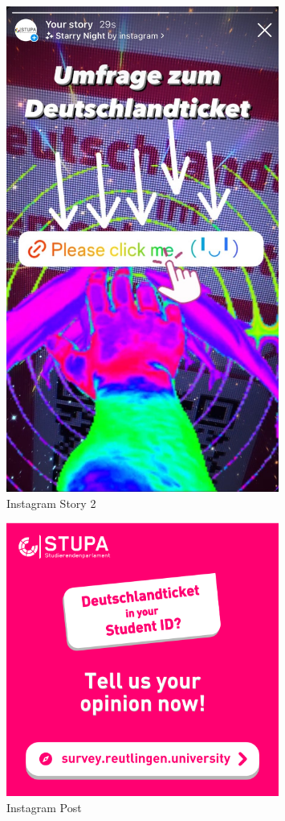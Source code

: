 \begin{multicols}{3}
\begin{figure}[H]
       \includegraphics[width=0.8\textwidth]{Content/Images/Story_2.jpeg}
       \caption{Instagram Story 2}
       \label{fig:InstagramStory2}
    \end{figure}
    \columnbreak
    \begin{figure}[H]
        \vspace{0.3\textwidth}
        \includegraphics[width=0.8\textwidth]{Content/Images/IG_Square.png}
        \caption{Instagram Post}
        \label{fig:InstagramPost}
    \end{figure}
\end{multicols}

